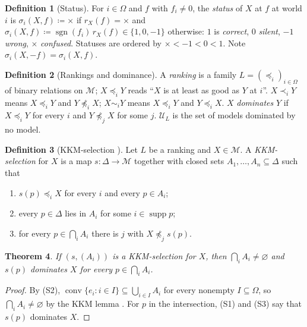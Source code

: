 \documentclass[11pt]{article}
\newcommand{\chg}[1]{{\color{red}#1}}
\newtheorem{theorem}{Theorem}[section]
\theoremstyle{definition}
\newtheorem{definition}[theorem]{Definition}
\theoremstyle{remark}
\newcommand{\M}{\mathcal M}
\newcommand{\U}{\mathcal U}
\newcommand{\supp}{\operatorname{supp}}
\newcommand{\sgn}{\operatorname{sgn}}
\newcommand{\conf}{\times}
\begin{document}
\begin{definition}[Status]\label{def:status}
For $i\in\Omega$ and $f$ with $f_i\neq0$, the \emph{status} of $X$ at $f$ at world $i$ is $\sigma_i(X,f)\coloneqq\conf$ if $r_X(f)=\conf$ and $\sigma_i(X,f)\coloneqq\sgn(f_i)\,r_X(f)\in\{1,0,-1\}$ otherwise: $1$ is \emph{correct}, $0$ \emph{silent}, $-1$ \emph{wrong}, $\conf$ \emph{confused}. Statuses are ordered by $\conf<-1<0<1$. Note $\sigma_i(X,-f)=\sigma_i(X,f)$.
\end{definition}

\begin{definition}[Rankings and dominance]\label{def:rankings}
A \emph{ranking} is a family $L=(\preceq_i)_{i\in\Omega}$ of binary relations on $\M$; $X\preceq_iY$ reads ``$X$ is at least as good as $Y$ at $i$''. $X\prec_iY$ means $X\preceq_iY$ and $Y\not\preceq_iX$; $X\sim_iY$ means $X\preceq_iY$ and $Y\preceq_iX$. $X$ \emph{dominates} $Y$ if $X\preceq_iY$ for every $i$ and $Y\not\preceq_jX$ for some $j$. $\U_L$ is the set of models dominated by no model.
\end{definition}

\begin{definition}[KKM-selection {\cite{KonekGR}}]\label{def:selection}
Let $L$ be a ranking and $X\in\M$. A \emph{KKM-selection} for $X$ is a map $s:\Delta\to\M$ together with closed sets $A_1,\dots,A_n\subseteq\Delta$ such that
\begin{enumerate}[label=(S\arabic*),leftmargin=3em]
\item $s(p)\preceq_iX$ for every $i$ and every $p\in A_i$;
\item every $p\in\Delta$ lies in $A_i$ for some $i\in\supp p$;
\item for every $p\in\bigcap_iA_i$ there is $j$ with $X\not\preceq_js(p)$.
\end{enumerate}
\end{definition}

\begin{theorem}\label{thm:selection}
\chg{\textup{\cite{KonekGR}}} If $(s,(A_i))$ is a KKM-selection for $X$, then $\bigcap_iA_i\neq\varnothing$ and $s(p)$ dominates $X$ for every $p\in\bigcap_iA_i$.
\end{theorem}
\begin{proof}
By (S2), $\operatorname{conv}\{e_i:i\in I\}\subseteq\bigcup_{i\in I}A_i$ for every nonempty $I\subseteq\Omega$, so $\bigcap_iA_i\neq\varnothing$ by the KKM lemma \cite{KKM1929}. For $p$ in the intersection, (S1) and (S3) say that $s(p)$ dominates $X$.
\end{proof}
\end{document}
